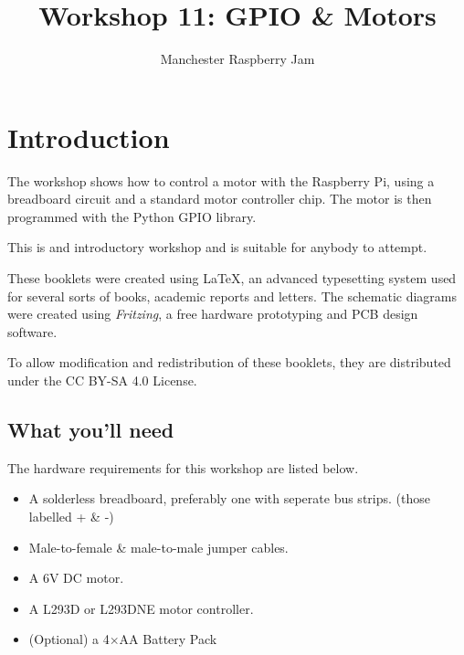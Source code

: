 \documentclass[a4paper, twocolumn, twoside, 11pt]{article}
\begin{document}
	\author{Manchester Raspberry Jam}
	\title{Workshop 11: GPIO \& Motors}
	\date{}

	\maketitle
	
	\setcounter{tocdepth}{1}
	\tableofcontents
	
	\setcounter{section}{-1}
	\section{Introduction}
	
		The workshop shows how to control a motor with the Raspberry Pi, using a breadboard circuit and a standard motor controller chip. The motor is then programmed with the Python GPIO library.

		This is and introductory workshop and is suitable for anybody to attempt.
		
		These booklets were created using {\selectfont \LaTeX}, an advanced typesetting system used for several sorts of books, academic reports and letters. The schematic diagrams were created using \textit{Fritzing}, a free hardware prototyping and PCB design software.
		
		To allow modification and redistribution of these booklets, they are distributed under the CC BY-SA 4.0 License.
	
		\subsection*{What you'll need}
			
			The hardware requirements for this workshop are listed below. %
	
			\begin{itemize}[noitemsep]		
				\item A solderless breadboard, preferably one with seperate bus strips. (those labelled + \& -)
				\item Male-to-female \& male-to-male jumper cables.
				\item A 6V DC motor.
				\item A L293D or L293DNE motor controller.
				\item (Optional) a 4$\times$AA Battery Pack				
			\end{itemize}
			
			\newpage
			
\end{document}
